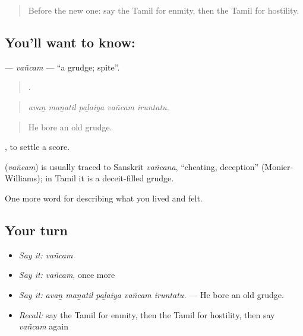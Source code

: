 \label{lesson:TA-C469-vancam}



\begin{quote}
Before the new one: say the Tamil for enmity, then the Tamil for hostility.
\end{quote}

\subsection*{You'll want to know: }
\textbf{} — \emph{vañcam} — \textquotedblleft{}a grudge; spite\textquotedblright{}.

\begin{quote}
    .
\end{quote}

\begin{quote}
\emph{avaṉ maṉatil paḻaiya vañcam iruntatu.}
\end{quote}

\begin{quote}
He bore an old grudge.
\end{quote}

 , to settle a score.

\begin{cousinweb}
\textbf{} (\emph{vañcam}) is usually traced to Sanskrit \emph{vañcana}, \textquotedblleft{}cheating, deception\textquotedblright{} (Monier-Williams); in Tamil it is a deceit-filled grudge.
\end{cousinweb}

\begin{grammarlens}[title={What you've built}]
One more word for describing what you lived and felt.
\end{grammarlens}

\subsection*{Your turn}
\begin{itemize}
\raggedright
  \item \emph{Say it:} \emph{vañcam}
  \item \emph{Say it:} \emph{vañcam}, once more
  \item \emph{Say it:} \emph{avaṉ maṉatil paḻaiya vañcam iruntatu.} — He bore an old grudge.
  \item \emph{Recall:} say the Tamil for enmity, then the Tamil for hostility, then say \emph{vañcam} again
\end{itemize}

